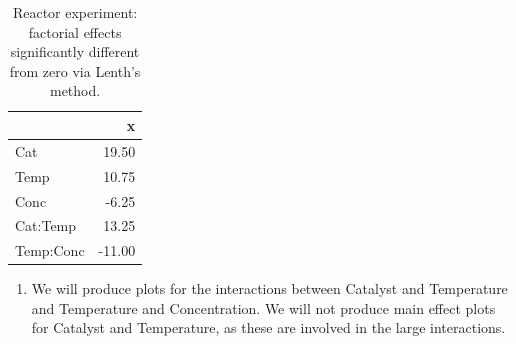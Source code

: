 \documentclass[
]{book}
\providecommand{\tightlist}{%
  \setlength{\itemsep}{0pt}\setlength{\parskip}{0pt}}
\theoremstyle{definition}
\theoremstyle{definition}
\theoremstyle{definition}
\theoremstyle{definition}
\theoremstyle{remark}
\begin{document}
\begin{table}

\caption{\label{tab:reactor-largest}Reactor experiment: factorial effects significantly different from zero via Lenth's method.}
\centering
\begin{tabular}[t]{l|r}
\hline
  & x\\
\hline
Cat & 19.50\\
\hline
Temp & 10.75\\
\hline
Conc & -6.25\\
\hline
Cat:Temp & 13.25\\
\hline
Temp:Conc & -11.00\\
\hline
\end{tabular}
\end{table}

\begin{enumerate}
\def\labelenumi{\alph{enumi}.}
\setcounter{enumi}{1}
\tightlist
\item
  We will produce plots for the interactions between Catalyst and Temperature and Temperature and Concentration. We will not produce main effect plots for Catalyst and Temperature, as these are involved in the large interactions.
\end{enumerate}
\end{document}
